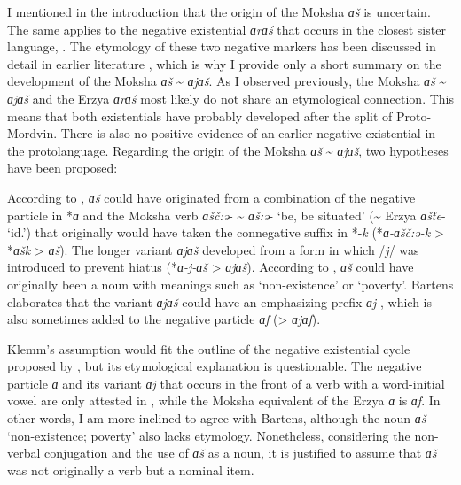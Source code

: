 \documentclass[output=paper,colorlinks,citecolor=brown,draft,draftmode]{langscibook}
\begin{document}
I mentioned in the introduction that the origin of the Moksha \textit{ɑ\v
s} is uncertain. The same applies to the negative existential
\textit{ɑrɑś} that occurs in the closest sister language, .
The etymology of these two negative markers has been discussed in detail in
earlier literature \parencites[see][107--113]{Hamari2007}[477--479]{Hamari2013}, which is why I provide only a short summary on the development of the Moksha \textit{ɑš} {\textasciitilde} \textit{ɑjɑš}. As I observed previously, the Moksha \textit{ɑš} {\textasciitilde} \textit{ɑjɑš} and the Erzya \textit{ɑrɑś} most likely do not share an etymological connection. This means that both existentials have probably developed after the split of Proto-Mordvin. There is also no positive evidence of an earlier negative existential in the protolanguage. Regarding the origin of the Moksha \textit{ɑš} {\textasciitilde} \textit{ɑjɑš}, two hypotheses have been proposed:

\begin{exe}
 {According to \citet[388]{Klemm1934}, \textit{ɑš} could have
    originated from a combination of the negative particle in *\textit{ɑ} and the Moksha verb \textit{ɑšč:ə}- {\textasciitilde} \textit{ɑš:ə}- `be, be situated' ({\textasciitilde} Erzya \textit{ɑšťe}- `id.') that originally would have taken the connegative suffix in *-\textit{k} (*\textit{ɑ-ɑšč:ə-k} > *\textit{ɑšk} > \textit{ɑš}). The longer variant \textit{ɑjɑš} developed from a form in which /\textit{j}/ was introduced to prevent hiatus (*\textit{ɑ-j-ɑš} > \textit{ɑjɑš}).}
 {According to \citet[79]{Bartens1996}, \textit{ɑš} could have originally been a noun with meanings such as `non-existence' or `poverty'. Bartens elaborates that the variant \textit{ɑjɑš} could have an emphasizing prefix \textit{ɑj}-, which is also sometimes added to the negative particle \textit{ɑf} (> \textit{ɑjɑf}).}
\end{exe}

Klemm's assumption would fit the outline of the negative existential cycle proposed by \citet{Croft1991}, but its etymological explanation is questionable. The negative particle \textit{ɑ} and its variant \textit{ɑj} that occurs in the front of a verb with a word-initial vowel are only attested in , while the Moksha equivalent of the Erzya \textit{ɑ} is \textit{ɑf}. In other words, I am more inclined to agree with Bartens, although the noun \textit{ɑš} `non-existence; poverty' also lacks etymology. Nonetheless, considering the non-verbal conjugation and the use of \textit{ɑš} as a noun, it is justified to assume that \textit{ɑš} was not originally a verb but a nominal item. 
\end{document}
